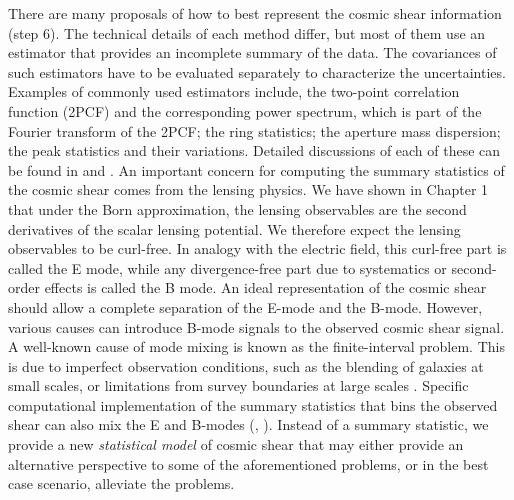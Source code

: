 There are many proposals of how to best represent the cosmic shear information
(step 6). The technical details of each method differ, but most of them use
an estimator that provides an incomplete summary of the data. The covariances of
such estimators have to be evaluated separately to characterize the
uncertainties.
Examples of commonly used estimators include, the two-point correlation function 
(2PCF) and the corresponding power spectrum, which is part of the Fourier transform of the 2PCF; 
the ring statistics; the aperture mass dispersion; the peak statistics and
their variations. Detailed discussions of each of these can be found in 
\cite{Kilbinger2015} and \cite{Bartelmann2001a}.
An important concern for computing the summary statistics of the cosmic shear 
comes from the lensing physics. We have shown in Chapter 1 that  
under the Born approximation, the lensing observables are the second derivatives of the
scalar lensing potential. We therefore expect the lensing observables to be curl-free.
In analogy with the electric field, this curl-free part is called the E mode, 
while any divergence-free part due to systematics or second-order effects is called the 
B mode.
An ideal representation of the
cosmic shear should allow a complete separation of the E-mode and the B-mode.
However, various causes can
introduce B-mode signals to the observed cosmic shear signal. A well-known
cause of mode mixing is known as the finite-interval problem. This is due to
imperfect observation conditions, such as the blending of galaxies at small scales,
or limitations from survey boundaries at large scales \citep{Kilbinger2013}.  
Specific computational implementation of the summary statistics that bins the 
observed shear can also mix the E and B-modes 
(\citealt{Eifler2010},
\citealt{Becker2013}). Instead of a summary statistic, we provide a new 
{\it statistical model} of cosmic shear that may either provide an alternative
perspective to some of the aforementioned problems, or in the best case
scenario, alleviate the problems. 
 
